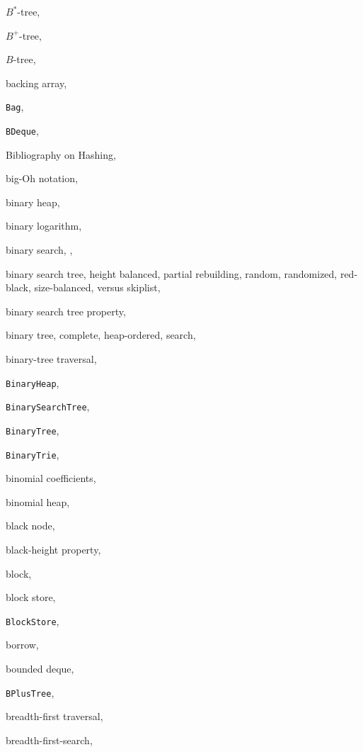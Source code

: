 \documentclass[10pt]{book}
\theoremstyle{plain}
\theoremstyle{definition}
\begin{document}
\begin{theindex}
  \item $B^*$-tree, 
  \item $B^+$-tree, 
  \item $B$-tree, 
  \item backing array, 
  \item \texttt{Bag}, 
  \item \texttt{BDeque}, 
  \item Bibliography on Hashing, 
  \item big-Oh notation, 
  \item binary heap, 
  \item binary logarithm, 
  \item binary search, , 
  \item binary search tree, 
    \subitem height balanced, 
    \subitem partial rebuilding, 
    \subitem random, 
    \subitem randomized, 
    \subitem red-black, 
    \subitem size-balanced, 
    \subitem versus skiplist, 
  \item binary search tree property, 
  \item binary tree, 
    \subitem complete, 
    \subitem heap-ordered, 
    \subitem search, 
  \item binary-tree traversal, 
  \item \texttt{BinaryHeap}, 
  \item \texttt{BinarySearchTree}, 
  \item \texttt{BinaryTree}, 
  \item \texttt{BinaryTrie}, 
  \item binomial coefficients, 
  \item binomial heap, 
  \item black node, 
  \item black-height property, 
  \item block, 
  \item block store, 
  \item \texttt{BlockStore}, 
  \item borrow, 
  \item bounded deque, 
  \item \texttt{BPlusTree}, 
  \item breadth-first traversal, 
  \item breadth-first-search, 


\end{theindex}
\end{document}
